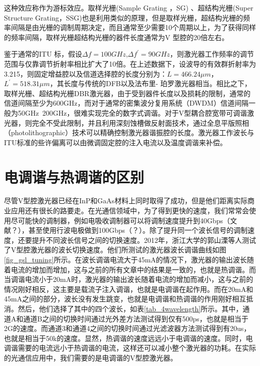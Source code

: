 \documentclass[oneside]{ZJUthesis}
\begin{document}
这种效应称作为游标效应。取样光栅(Sample Grating ，SG) 、超结构光栅(Super Structure Grating，SSG)也是利用类似的原理，但是取样光栅，超结构光栅的频率间隔是由光栅的调制周期决定，而且通常至少需要10个周期以上，为了获得同样的频率间隔，取样光栅超结构光栅的器件长度通常为V 型腔的20倍左右。

鉴于通常的ITU 标，假设$\Delta f=100GHz$,$\Delta f^\prime=90GHz$，则激光器工作频率的调节范围与仅靠调节折射率相比扩大了10倍。在上述数据下，设波导的有效群折射率为3.215，则固定增益腔以及信道选择腔的长度分别为：$L=466.24\mu m$，$L^\prime=518.31\mu m$，其长度与传统的DFB以及法布里- 珀罗激光器相当。相比之下，取样光栅、超结构光栅DBR激光器，由于受到器件长度以及损耗的限制，通常的信道间隔至少为600GHz，而对于通常的密集波分复用系统（DWDM）信道间隔一般为50GHz~200GHz，很难实现完全的数字式调谐。对于V型耦合腔宽带可调谐激光器，则完全不受此限制，并且利用深刻蚀槽做反射面技术，通过全息平版照相（photolithographic）技术可以精确控制激光器谐振腔的长度。激光器工作波长与ITU标准的些许偏离可以由微调固定腔的注入电流以及温度调谐来补偿。

\section{电调谐与热调谐的区别}

尽管V型腔激光器已经在InP和GaAs材料上同时取得了成功，但是他们距离实际商业应用还有很长的路要走。在光通信领域中，为了得到更快的速度，我们常常会使用尽可能快的调制器，例如电吸收调制器可以将调制速度提升到40Gbps（文献？），甚至使用行波电极做到100Gbps（？）。除了提升同一个波长信号的调制速度，还要提升不同波长信号之间的切换速度。2012年，浙江大学的郭山溧等人测试了V型腔激光器的波长切换速度\cite{guo2012experimental}。他们所测试的激光器波长调谐曲线如图\ref{fig_gsl_tuning}所示。在波长调谐电流大于45mA的情况下，激光器的输出波长随着电流的增加而增加，这与之前的所有文章中的结果是一致的，也就是热调谐。而当调谐电流小于20mA时，激光器的输出波长随着电流的增加而减小，这与之前的情况刚好相反，这主要是载流子注入调谐，也就是电调谐在起作用。而在20mA和45mA之间的部分，波长没有发生跳变，也就是电调谐和热调谐的作用刚好相互抵消。然后，他们选择了其中的四个波长，如表\ref{tab_4wavelength}所示。其中，通道A和通道B之间的切换时间通过光外差方法测试得到仅有500ps，也就是相当于2G的速度。而通道3和通道4之间的切换时间通过光滤波器方法测试得到有20us，也就是相当于50k的速度。显然，热调谐的速度远远小于电调谐的速度。同时，电调谐需要的电流远小于热调谐的电流，这样还可以减小整个激光器的功耗。在实际的光通信应用中，我们需要的是电调谐的V型腔激光器。
\end{document}
